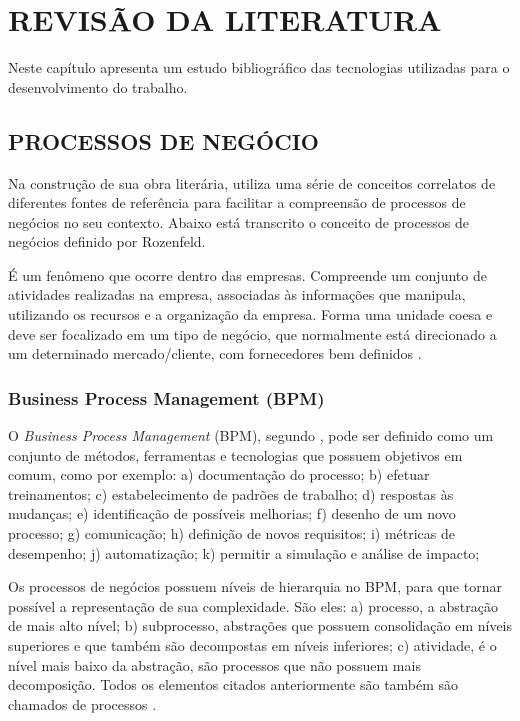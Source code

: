 \documentclass[
	12pt,				%
	openright,			%
	oneside,			%
	a4paper,			%
	chapter=TITLE,		%
	section=TITLE,		%
	english,			%
	french,				%
	spanish,			%
	brazil				%
	]{abntex2}
\begin{document}
\chapter{REVISÃO DA LITERATURA}\label{cap-revisao}
Neste capítulo apresenta um estudo bibliográfico das tecnologias utilizadas para o desenvolvimento do trabalho.

\section{PROCESSOS DE NEGÓCIO}
Na construção de sua obra literária,  utiliza uma série de conceitos correlatos de diferentes fontes de referência para facilitar a compreensão de processos de negócios no seu contexto. Abaixo está transcrito o conceito de processos de negócios definido por Rozenfeld.

\begin{citacao}
É um fenômeno que ocorre dentro das empresas. Compreende um conjunto de atividades realizadas na empresa, associadas às informações que manipula, utilizando os recursos e a organização da empresa. Forma uma unidade coesa e deve ser focalizado em um tipo de negócio, que normalmente está direcionado a um determinado mercado/cliente, com fornecedores bem definidos \cite[p. 538]{rozenfeldProcesso}.
\end{citacao}

\subsection{Business Process Management (BPM)}
O \textit{Business Process Management} (BPM), segundo , pode ser definido como um conjunto de métodos, ferramentas e tecnologias que possuem objetivos em comum, como por exemplo: a) documentação do processo; b) efetuar treinamentos; c) estabelecimento de padrões de trabalho; d) respostas às mudanças; e) identificação de possíveis melhorias; f) desenho de um novo processo; g) comunicação; h) definição de novos requisitos; i) métricas de desempenho; j) automatização; k) permitir a simulação e análise de impacto; 

Os processos de negócios possuem níveis de hierarquia no BPM, para que tornar possível a representação de sua complexidade. São eles: a) processo, a abstração de mais alto nível; b) subprocesso, abstrações que possuem consolidação em níveis superiores e que também são decompostas em níveis inferiores; c) atividade, é o nível mais baixo da abstração, são processos que não possuem mais decomposição. Todos os elementos citados anteriormente são também são chamados de processos \cite{sordiGestaoModerna}.
\end{document}
